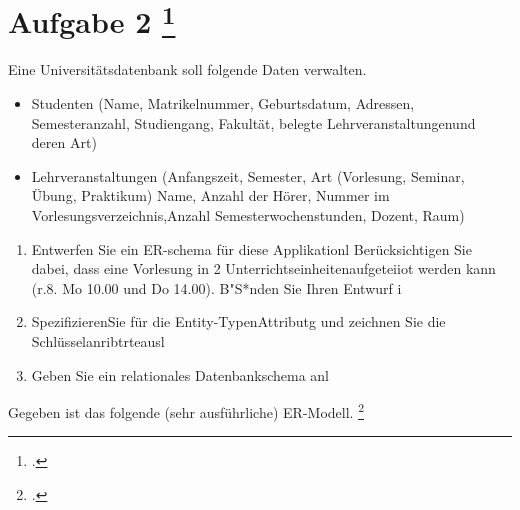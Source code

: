 \documentclass{lehramt-informatik-aufgabe}
\begin{document}

\section{Aufgabe 2
\footcite[Aufgabe 2]{examen:66111:1996:03}}

Eine Universitätsdatenbank soll folgende Daten verwalten.

\begin{itemize}
\item Studenten (Name, Matrikelnummer, Geburtsdatum, Adressen,
Semesteranzahl, Studiengang, Fakultät, belegte Lehrveranstaltungenund
deren Art)

\item Lehrveranstaltungen (Anfangszeit, Semester, Art (Vorlesung,
Seminar, Übung, Praktikum) Name, Anzahl der Hörer, Nummer im
Vorlesungsverzeichnis,Anzahl Semesterwochenstunden, Dozent, Raum)
\end{itemize}

\begin{enumerate}
\item Entwerfen Sie ein ER-schema für diese Applikationl
Berücksichtigen Sie dabei, dass eine Vorlesung in 2
Unterrichtseinheitenaufgeteiiot werden kann (r.8. Mo 10.00 und Do
14.00). B"S*nden Sie Ihren Entwurf i

\item SpezifizierenSie für die Entity-TypenAttributg und zeichnen Sie
die Schlüsselanribtrteausl

\item Geben Sie ein relationales Datenbankschema anl
\end{enumerate}

Gegeben ist das folgende (sehr ausführliche) ER-Modell.
\footcite[Aufgabe 2: Uni-ER-Modell]{db:ab:4}
\end{document}
